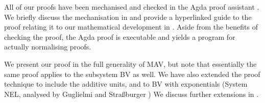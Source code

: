 All of our proofs have been mechanised and checked in the Agda proof assistant \cite{Agda264}. We briefly discuss the mechanisation in  and provide a hyperlinked guide to the proof relating it to our mathematical development in . Aside from the benefits of checking the proof, the Agda proof is executable and yields a program for actually normalising proofs.

We present our proof in the full generality of MAV, but note that essentially the same proof applies to the subsystem BV as well. We have also extended the proof technique to include the additive units, and to BV with exponentials (System NEL, analysed by Guglielmi and Stra{\ss}burger \cite{Burger_2011,GuglielmiS11}) We discuss further extensions in .
